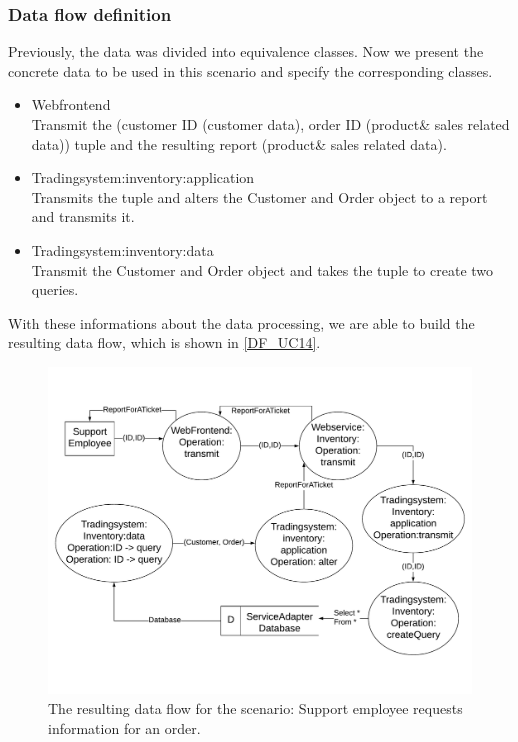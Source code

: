 \subsubsection{Data flow definition}
Previously, the data was divided into equivalence classes.  Now we present the concrete data to be used in this scenario and specify the corresponding classes.\\
\begin{itemize}
\item Webfrontend\\ Transmit the (customer ID (customer data), order ID (product\& sales related data)) tuple and the resulting report (product\& sales related data).
\item Tradingsystem:inventory:application \\ Transmits the tuple and alters the Customer and Order object to a report and transmits it.
\item Tradingsystem:inventory:data \\ Transmit the Customer and Order object and takes the tuple to create two queries.
\end{itemize}
With these informations about the data processing, we are able to build the resulting data flow, which is shown in \autoref{DF_UC14}.

\begin{figure}
\includegraphics[scale=0.8, angle = 90]{logos/DF_UC14.pdf}
\caption{The resulting data flow for the scenario: Support employee requests information for an order.}
\label{DF_UC14}
\end{figure}
